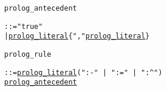 
\begin{alltt}
\hypertarget{prolog_antecedentP\newLinkVer}{prolog_antecedent}
   ::=   "true"
       | \hyperlink{prolog_literalP\newLinkVer}{prolog_literal} \verb"{""," \hyperlink{prolog_literalP\linkVer}{prolog_literal}\verb"}"
		      
\hypertarget{prolog_ruleP\newLinkVer}{prolog_rule} ::= \hyperlink{prolog_literalP\linkVer}{prolog_literal} \verb+(":-" | ":=" | ":^")+
                \hyperlink{prolog_antecedentP\linkVer}{prolog_antecedent}
\end{alltt}
